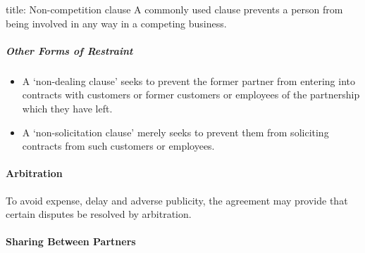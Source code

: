 \documentclass[
]{article}
\newenvironment{Shaded}{}{}
\newcommand{\NormalTok}[1]{#1}
\providecommand{\tightlist}{%
  \setlength{\itemsep}{0pt}\setlength{\parskip}{0pt}}
\begin{document}
\begin{Shaded}
\begin{Highlighting}[]
\NormalTok{title: Non{-}competition clause}
\NormalTok{A commonly used clause prevents a person from being involved in any way in a competing business. }
\end{Highlighting}
\end{Shaded}

\hypertarget{other-forms-of-restraint}{%
\subparagraph{Other Forms of Restraint}\label{other-forms-of-restraint}}

\begin{itemize}
\tightlist
\item
  A `non-dealing clause' seeks to prevent the former partner from
  entering into contracts with customers or former customers or
  employees of the partnership which they have left.
\item
  A `non-solicitation clause' merely seeks to prevent them from
  soliciting contracts from such customers or employees.
\end{itemize}

\hypertarget{arbitration}{%
\paragraph{Arbitration}\label{arbitration}}

To avoid expense, delay and adverse publicity, the agreement may provide
that certain disputes be resolved by arbitration.

\hypertarget{sharing-between-partners}{%
\paragraph{Sharing Between Partners}\label{sharing-between-partners}}
\end{document}
